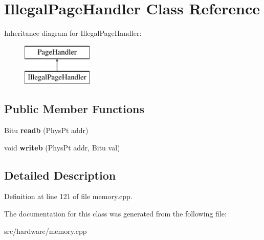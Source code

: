 \hypertarget{classIllegalPageHandler}{\section{Illegal\-Page\-Handler Class Reference}
\label{classIllegalPageHandler}
}
Inheritance diagram for Illegal\-Page\-Handler\-:\begin{figure}[H]
\begin{center}
\leavevmode
\includegraphics[height=2.000000cm]{classIllegalPageHandler}
\end{center}
\end{figure}
\subsection*{Public Member Functions}
\begin{DoxyCompactItemize}
\item 
\hypertarget{classIllegalPageHandler_a76f1d0cf8cacaa7a54d9cd87dcd77aa3}{Bitu {\bfseries readb} (Phys\-Pt addr)}\label{classIllegalPageHandler_a76f1d0cf8cacaa7a54d9cd87dcd77aa3}

\item 
\hypertarget{classIllegalPageHandler_a061eb7abdb84d8bc85d8c83fecbe371e}{void {\bfseries writeb} (Phys\-Pt addr, Bitu val)}\label{classIllegalPageHandler_a061eb7abdb84d8bc85d8c83fecbe371e}

\end{DoxyCompactItemize}


\subsection{Detailed Description}


Definition at line 121 of file memory.\-cpp.



The documentation for this class was generated from the following file\-:\begin{DoxyCompactItemize}
\item 
src/hardware/memory.\-cpp\end{DoxyCompactItemize}
